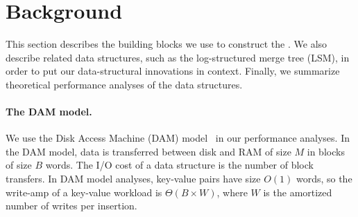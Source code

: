 \section{Background}
\label{sec:background}          

This section describes the building blocks we use to construct the
\datastruct.  We also describe related data structures, such as the
log-structured merge tree (LSM), in order to put our data-structural
innovations in context.  Finally, we summarize theoretical performance
analyses of the data structures.







\paragraph{The DAM model.}
We use the Disk Access Machine (DAM) model~\cite{DBLP:conf/icalp/AggarwalV87}
in our performance analyses.  In the DAM model, data is transferred between
disk and RAM of size $M$ in blocks of size $B$ words.  The I/O cost of a data
structure is the number of block transfers.
%
In DAM model analyses, key-value pairs have size $O(1)$ words, so  the
write-amp 
of a key-value workload is
$\Theta(B\times W)$,
where $W$ is the amortized number of writes per insertion.

